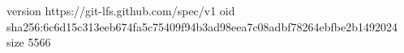 version https://git-lfs.github.com/spec/v1
oid sha256:6c6d15c313eeb674fa5c75409f94b3ad98eea7c08adbf78264ebfbe2b1492024
size 5566
